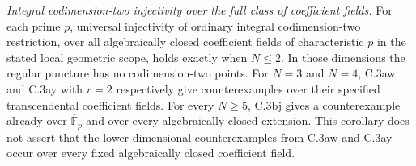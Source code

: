 \noindent\emph{Integral codimension-two injectivity over the full class
of coefficient fields.} For each prime $p$, universal injectivity of
ordinary integral codimension-two restriction, over all algebraically
closed coefficient fields of characteristic $p$ in the stated local
geometric scope, holds exactly when $N\le2$. In those dimensions the
regular puncture has no codimension-two points. For $N=3$ and $N=4$,
C.3aw and C.3ay with $r=2$ respectively give counterexamples over their
specified transcendental coefficient fields. For every $N\ge5$,
C.3bj gives a counterexample already over $\overline{\mathbb F}_p$
and over every algebraically closed extension. This corollary does
not assert that the lower-dimensional counterexamples from C.3aw
and C.3ay occur over every fixed algebraically closed coefficient field.
